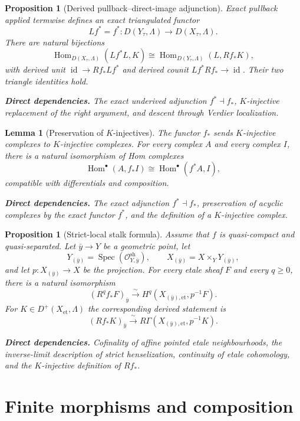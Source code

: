 \documentclass[10pt]{article}
\newtheorem{proposition}[theorem]{Proposition}
\newtheorem{lemma}[theorem]{Lemma}
\theoremstyle{definition}
\newcommand{\Spec}{\operatorname{Spec}}
\newcommand{\Hom}{\operatorname{Hom}}
\newcommand{\deps}[1]{\par\smallskip\noindent\textbf{Direct dependencies.} #1}
\begin{document}
\begin{proposition}[Derived pullback--direct-image adjunction]
Exact pullback applied termwise defines an exact triangulated functor
\[
 Lf^*=f^*:D(Y_\tau,\Lambda)\longrightarrow D(X_\tau,\Lambda).
\]
There are natural bijections
\[
 \Hom_{D(X_\tau,\Lambda)}(Lf^*L,K)
 \cong
 \Hom_{D(Y_\tau,\Lambda)}(L,Rf_*K),
\]
with derived unit $\operatorname{id}\to Rf_*Lf^*$ and derived counit
$Lf^*Rf_*\to\operatorname{id}$.  Their two triangle identities hold.
\deps{The exact underived adjunction $f^*\dashv f_*$, $K$-injective
replacement of the right argument, and descent through Verdier
localization.}
\end{proposition}

\begin{lemma}[Preservation of $K$-injectives]
The functor $f_*$ sends $K$-injective complexes to $K$-injective complexes.
For every complex $A$ and every complex $I$, there is a natural isomorphism
of Hom complexes
\[
 \Hom^\bullet(A,f_*I)\cong\Hom^\bullet(f^*A,I),
\]
compatible with differentials and composition.
\deps{The exact adjunction $f^*\dashv f_*$, preservation of acyclic
complexes by the exact functor $f^*$, and the definition of a $K$-injective
complex.}
\end{lemma}

\begin{proposition}[Strict-local stalk formula]
Assume that $f$ is quasi-compact and quasi-separated.  Let
$\bar y\to Y$ be a geometric point, let
\[
 Y_{(\bar y)}=\Spec(\mathcal O^{\mathrm{sh}}_{Y,\bar y}),
 \qquad
 X_{(\bar y)}=X\times_YY_{(\bar y)},
\]
and let $p:X_{(\bar y)}\to X$ be the projection.  For every etale sheaf $F$
and every $q\geq0$, there is a natural isomorphism
\[
 (R^qf_*F)_{\bar y}
 \xrightarrow{\ \sim\ }
 H^q(X_{(\bar y),\mathrm{et}},p^{-1}F).
\]
For $K\in D^+(X_{\mathrm{et}},\Lambda)$ the corresponding derived statement
is
\[
 (Rf_*K)_{\bar y}
 \xrightarrow{\ \sim\ }
 R\Gamma(X_{(\bar y),\mathrm{et}},p^{-1}K).
\]
\deps{Cofinality of affine pointed etale neighbourhoods, the inverse-limit
description of strict henselization, continuity of etale cohomology, and the
$K$-injective definition of $Rf_*$.}
\end{proposition}

\section{Finite morphisms and composition}
\end{document}
